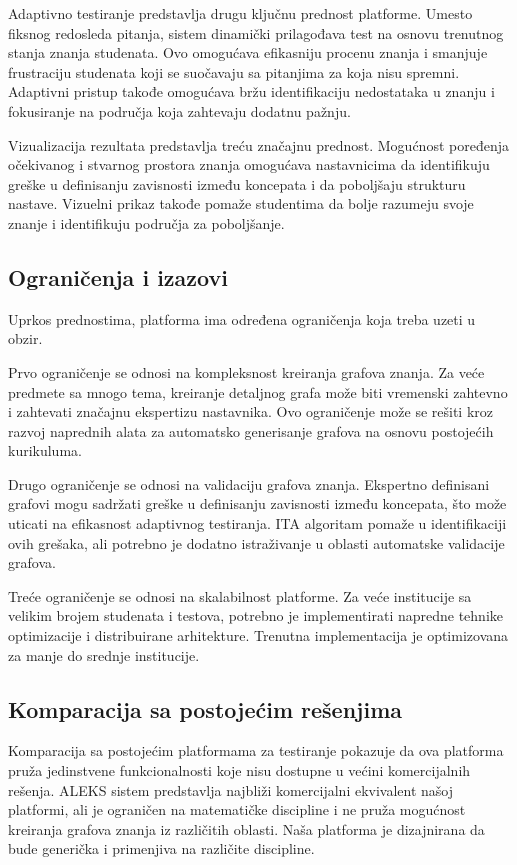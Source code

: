 \documentclass[conference]{IEEEtran}
\begin{document}
Adaptivno testiranje predstavlja drugu ključnu prednost platforme. Umesto fiksnog redosleda pitanja, sistem dinamički prilagođava test na osnovu trenutnog stanja znanja studenata. Ovo omogućava efikasniju procenu znanja i smanjuje frustraciju studenata koji se suočavaju sa pitanjima za koja nisu spremni. Adaptivni pristup takođe omogućava bržu identifikaciju nedostataka u znanju i fokusiranje na područja koja zahtevaju dodatnu pažnju.

Vizualizacija rezultata predstavlja treću značajnu prednost. Mogućnost poređenja očekivanog i stvarnog prostora znanja omogućava nastavnicima da identifikuju greške u definisanju zavisnosti između koncepata i da poboljšaju strukturu nastave. Vizuelni prikaz takođe pomaže studentima da bolje razumeju svoje znanje i identifikuju područja za poboljšanje.

\subsection{Ograničenja i izazovi}

Uprkos prednostima, platforma ima određena ograničenja koja treba uzeti u obzir. 

Prvo ograničenje se odnosi na kompleksnost kreiranja grafova znanja. Za veće predmete sa mnogo tema, kreiranje detaljnog grafa može biti vremenski zahtevno i zahtevati značajnu ekspertizu nastavnika. Ovo ograničenje može se rešiti kroz razvoj naprednih alata za automatsko generisanje grafova na osnovu postojećih kurikuluma.

Drugo ograničenje se odnosi na validaciju grafova znanja. Ekspertno definisani grafovi mogu sadržati greške u definisanju zavisnosti između koncepata, što može uticati na efikasnost adaptivnog testiranja. ITA algoritam pomaže u identifikaciji ovih grešaka, ali potrebno je dodatno istraživanje u oblasti automatske validacije grafova.

Treće ograničenje se odnosi na skalabilnost platforme. Za veće institucije sa velikim brojem studenata i testova, potrebno je implementirati napredne tehnike optimizacije i distribuirane arhitekture. Trenutna implementacija je optimizovana za manje do srednje institucije.

\subsection{Komparacija sa postojećim rešenjima}

Komparacija sa postojećim platformama za testiranje pokazuje da ova platforma pruža jedinstvene funkcionalnosti koje nisu dostupne u većini komercijalnih rešenja. 
ALEKS sistem predstavlja najbliži komercijalni ekvivalent našoj platformi, ali je ograničen na matematičke discipline i ne pruža mogućnost kreiranja grafova znanja iz različitih oblasti. Naša platforma je dizajnirana da bude generička i primenjiva na različite discipline.
\end{document}
